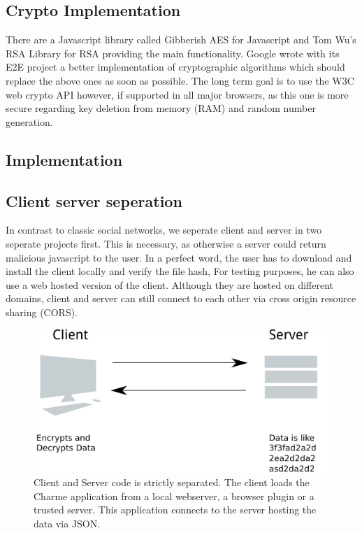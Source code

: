 \documentclass{scrartcl}
\begin{document}
\subsection{Crypto Implementation}
There are a Javascript library called Gibberish AES for Javascript and Tom Wu's RSA Library for RSA providing the main functionality. Google wrote with its E2E project a better implementation of cryptographic algorithms which should replace the above ones as soon as possible. The long term goal is to use the W3C web crypto API however, if supported in all major browsers, as this one is more secure regarding key deletion from memory (RAM) and random number generation. 

\subsection{Implementation}
 \subsection{Client server seperation}
In contrast to classic social networks, we seperate client and server in two seperate projects first. This is necessary, as otherwise a server could return malicious javascript to the user. In a perfect word, the user has to download and install the client locally and verify the file hash, For testing purposes, he can also use a web hosted version of the client. Although they are hosted on different domains, client and server can still connect to each other via cross origin resource sharing (CORS).

\begin{figure}[ht]
	\centering
  \includegraphics[]{eds.pdf}
	\caption{Client and Server code is strictly separated. The client loads the Charme application from a local webserver, a browser plugin or a trusted server. This application connects to the server hosting the data via JSON.}
	\label{fig1}
\end{figure}
\end{document}
